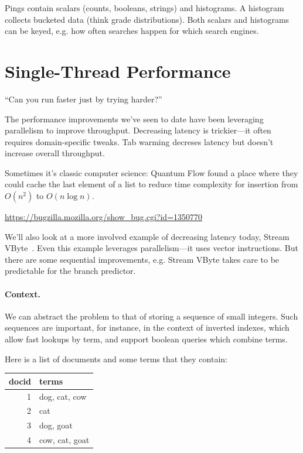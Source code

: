 \documentclass[a4paper]{report}
\begin{document}
Pings contain scalars (counts, booleans, strings) and histograms. A histogram collects
bucketed data (think grade distributions). Both scalars and histograms can be keyed, e.g.
how often searches happen for which search engines.



\section*{Single-Thread Performance}

\hfill ``Can you run faster just by trying harder?''

The performance improvements we've seen to date have been leveraging parallelism
to improve throughput. Decreasing latency is trickier---it often requires domain-specific
tweaks. Tab warming decreses latency but doesn't increase overall throughput.

Sometimes it's classic computer science: Quantum Flow found a place
where they could cache the last element of a list to reduce time
complexity for insertion from $O(n^2)$ to $O(n \log n)$.

\begin{center}
\url{https://bugzilla.mozilla.org/show_bug.cgi?id=1350770}
\end{center}

We'll also look at a more involved example of decreasing latency today, Stream VByte~\cite{LEMIRE20181}.
Even this example leverages parallelism---it uses vector instructions. But there
are some sequential improvements, e.g. Stream VByte takes care to be predictable
for the branch predictor.

\paragraph{Context.} We can abstract the problem to that of storing a sequence of small integers.
Such sequences are important, for instance, in the context of inverted indexes, which allow
fast lookups by term, and support boolean queries which combine terms.

Here is a list of documents and some terms that they contain:
\begin{center}
\begin{tabular}{r|l}
docid & terms \\ \hline
1 & dog, cat, cow\\
2 & cat\\
3 & dog, goat\\
4 & cow, cat, goat\\
\end{tabular}
\end{center}
\end{document}
